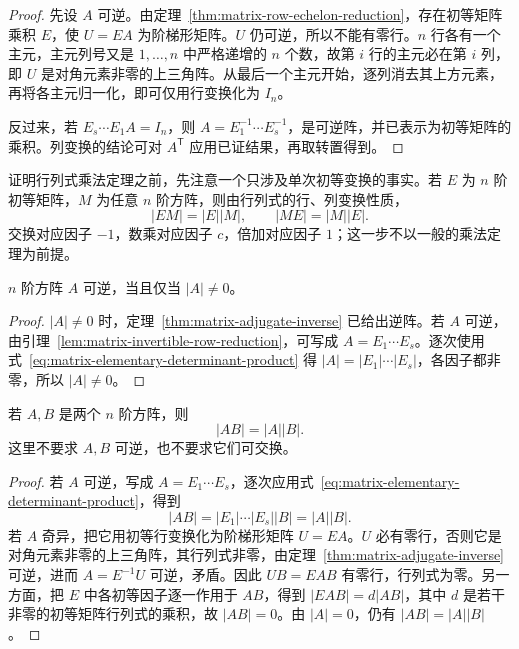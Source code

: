\begin{proof}
先设 $A$ 可逆。由定理~\ref{thm:matrix-row-echelon-reduction}，存在初等矩阵乘积 $E$，使 $U=EA$ 为阶梯形矩阵。$U$ 仍可逆，所以不能有零行。$n$ 行各有一个主元，主元列号又是 $1,\ldots,n$ 中严格递增的 $n$ 个数，故第 $i$ 行的主元必在第 $i$ 列，即 $U$ 是对角元素非零的上三角阵。从最后一个主元开始，逐列消去其上方元素，再将各主元归一化，即可仅用行变换化为 $I_n$。

反过来，若 $E_s\cdots E_1A=I_n$，则 $A=E_1^{-1}\cdots E_s^{-1}$，是可逆阵，并已表示为初等矩阵的乘积。列变换的结论可对 $A^{\mathsf T}$ 应用已证结果，再取转置得到。
\end{proof}

证明行列式乘法定理之前，先注意一个只涉及单次初等变换的事实。若 $E$ 为 $n$ 阶初等矩阵，$M$ 为任意 $n$ 阶方阵，则由行列式的行、列变换性质，
\begin{equation}
\label{eq:matrix-elementary-determinant-product}
    |EM|=|E||M|,\qquad |ME|=|M||E|.
\end{equation}
交换对应因子 $-1$，数乘对应因子 $c$，倍加对应因子 $1$；这一步不以一般的乘法定理为前提。

\begin{theorem}[可逆的行列式判别]
\label{thm:matrix-invertible-determinant}
$n$ 阶方阵 $A$ 可逆，当且仅当 $|A|\ne0$。
\end{theorem}

\begin{proof}
$|A|\ne0$ 时，定理~\ref{thm:matrix-adjugate-inverse} 已给出逆阵。若 $A$ 可逆，由引理~\ref{lem:matrix-invertible-row-reduction}，可写成 $A=E_1\cdots E_s$。逐次使用式~\eqref{eq:matrix-elementary-determinant-product} 得 $|A|=|E_1|\cdots|E_s|$，各因子都非零，所以 $|A|\ne0$。
\end{proof}

\begin{theorem}[行列式乘法定理]
\label{thm:matrix-determinant-product}
若 $A,B$ 是两个 $n$ 阶方阵，则
\begin{equation}
\label{eq:matrix-determinant-product}
    |AB|=|A||B|.
\end{equation}
这里不要求 $A,B$ 可逆，也不要求它们可交换。
\end{theorem}

\begin{proof}
若 $A$ 可逆，写成 $A=E_1\cdots E_s$，逐次应用式~\eqref{eq:matrix-elementary-determinant-product}，得到
\[
    |AB|=|E_1|\cdots|E_s||B|=|A||B|.
\]
若 $A$ 奇异，把它用初等行变换化为阶梯形矩阵 $U=EA$。$U$ 必有零行，否则它是对角元素非零的上三角阵，其行列式非零，由定理~\ref{thm:matrix-adjugate-inverse} 可逆，进而 $A=E^{-1}U$ 可逆，矛盾。因此 $UB=EAB$ 有零行，行列式为零。另一方面，把 $E$ 中各初等因子逐一作用于 $AB$，得到 $|EAB|=d|AB|$，其中 $d$ 是若干非零的初等矩阵行列式的乘积，故 $|AB|=0$。由 $|A|=0$，仍有 $|AB|=|A||B|$。
\end{proof}

